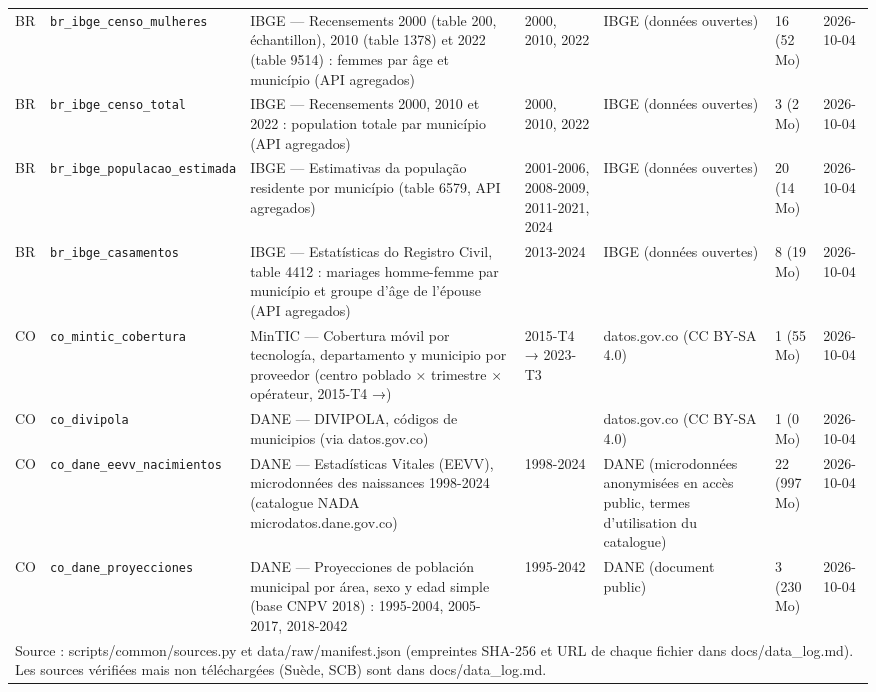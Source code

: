 \begin{longtable}{lp{2.2cm}p{3.9cm}p{2.1cm}p{1.9cm}p{1.4cm}p{1.6cm}}
BR & \texttt{br\_\allowbreak{}ibge\_\allowbreak{}censo\_\allowbreak{}mulheres} & IBGE — Recensements 2000 (table 200, échantillon), 2010 (table 1378) et 2022 (table 9514) : femmes par âge et município (API agregados) & 2000, 2010, 2022 & IBGE (données ouvertes) & 16 (52 Mo) & 2026-10-04 \\
BR & \texttt{br\_\allowbreak{}ibge\_\allowbreak{}censo\_\allowbreak{}total} & IBGE — Recensements 2000, 2010 et 2022 : population totale par município (API agregados) & 2000, 2010, 2022 & IBGE (données ouvertes) & 3 (2 Mo) & 2026-10-04 \\
BR & \texttt{br\_\allowbreak{}ibge\_\allowbreak{}populacao\_\allowbreak{}estimada} & IBGE — Estimativas da população residente por município (table 6579, API agregados) & 2001-2006, 2008-2009, 2011-2021, 2024 & IBGE (données ouvertes) & 20 (14 Mo) & 2026-10-04 \\
BR & \texttt{br\_\allowbreak{}ibge\_\allowbreak{}casamentos} & IBGE — Estatísticas do Registro Civil, table 4412 : mariages homme-femme par município et groupe d'âge de l'épouse (API agregados) & 2013-2024 & IBGE (données ouvertes) & 8 (19 Mo) & 2026-10-04 \\
CO & \texttt{co\_\allowbreak{}mintic\_\allowbreak{}cobertura} & MinTIC — Cobertura móvil por tecnología, departamento y municipio por proveedor (centro poblado × trimestre × opérateur, 2015-T4 →) & 2015-T4 → 2023-T3 & datos.gov.co (CC BY-SA 4.0) & 1 (55 Mo) & 2026-10-04 \\
CO & \texttt{co\_\allowbreak{}divipola} & DANE — DIVIPOLA, códigos de municipios (via datos.gov.co) &  & datos.gov.co (CC BY-SA 4.0) & 1 (0 Mo) & 2026-10-04 \\
CO & \texttt{co\_\allowbreak{}dane\_\allowbreak{}eevv\_\allowbreak{}nacimientos} & DANE — Estadísticas Vitales (EEVV), microdonnées des naissances 1998-2024 (catalogue NADA microdatos.dane.gov.co) & 1998-2024 & DANE (microdonnées anonymisées en accès public, termes d'utilisation du catalogue) & 22 (997 Mo) & 2026-10-04 \\
CO & \texttt{co\_\allowbreak{}dane\_\allowbreak{}proyecciones} & DANE — Proyecciones de población municipal por área, sexo y edad simple (base CNPV 2018) : 1995-2004, 2005-2017, 2018-2042 & 1995-2042 & DANE (document public) & 3 (230 Mo) & 2026-10-04 \\
\bottomrule
\multicolumn{7}{p{14.8cm}}{\footnotesize Source : scripts/common/sources.py et data/raw/manifest.json (empreintes SHA-256 et URL de chaque fichier dans docs/data\_log.md). Les sources vérifiées mais non téléchargées (Suède, SCB) sont dans docs/data\_log.md.}
\end{longtable}
